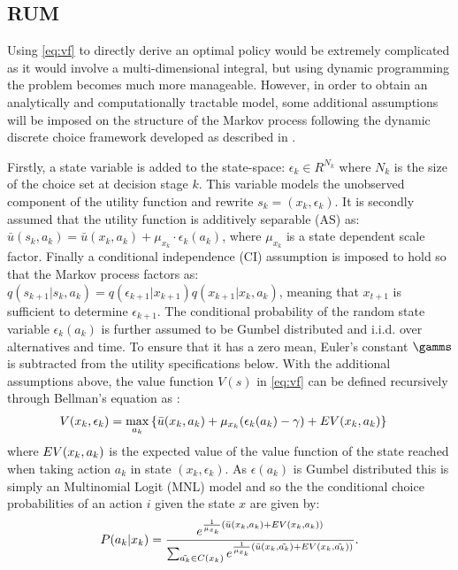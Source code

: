 \subsection{RUM}
Using \eqref{eq:vf} to directly derive an optimal policy would be extremely complicated as it would involve a multi-dimensional integral, but using dynamic programming the problem becomes much more manageable. However, in order to obtain an analytically and computationally tractable model, some additional assumptions will be imposed on the structure of the Markov process following the dynamic discrete choice framework developed as described in \citet{Rust87}.

Firstly, a state variable is added to the state-space: $\epsilon_k \in R^{N_k}$ where $N_k$ is the size of the choice set at decision stage $k$. This variable models the unobserved component of the utility function and rewrite $s_k=(x_k,\epsilon_k)$. It is secondly assumed that the utility function is additively separable (AS) as: $\bar{u}(s_k,a_k)=\bar{u}(x_k,a_k) + \mu_{x_k}\cdot\epsilon_k(a_k)$, where $\mu_{x_k}$ is a state dependent scale factor. Finally a conditional independence (CI) assumption is imposed to hold so that the Markov process factors as: $q(s_{k+1}|s_k,a_k)=q(\epsilon_{k+1}|x_{k+1})q(x_{k+1}|x_k,a_k)$, meaning that $x_{t+1}$ is sufficient to determine $\epsilon_{k+1}$. The conditional probability of the random state variable $\epsilon_k(a_k)$ is further assumed to be Gumbel distributed and i.i.d. over alternatives and time. To ensure that it has a zero mean, Euler's constant $\gamms$ is subtracted from the utility specifications below.
With the additional assumptions above, the value function $V(s)$ in \eqref{eq:vf} can be defined recursively through Bellman's equation as \citep{bellman,Rust87}:
\begin{equation} \label{eq:vfbellman}
\begin{aligned}
V(x_k,\epsilon_k) &= \max_{a_k} \left\{\bar{u}(x_k,a_k) + \mu_{x_k} (\epsilon_k(a_k)-\gamma)+ \eutil(x_k,a_k) \right\} 
\end{aligned}
\end{equation}
where $EV(x_k,a_k) $ is the expected value of the value function of the state reached when taking action $a_k$ in state $(x_k,\epsilon_k)$. As $\epsilon(a_k)$ is Gumbel distributed this is simply an Multinomial Logit (MNL) model and so the the conditional choice probabilities of an action $i$ given the state $x$ are given by:
\newcommand{\akt}{\tilde{a_k}}
\begin{equation} \label{eq:pcond}
P(a_k|x_k) = \frac{e^{\frac{1}{\mu_{x_k}}\left(\bar{u}(x_k,a_k) + \eutil(x_k,a_k)\right)}}{\sum_{\akt \in C(x_k)}e^{\frac{1}{\mu_{x_k}}\left(\bar{u}(x_k,\akt) + \eutil(x_k,\akt)\right)}}.
\end{equation}


